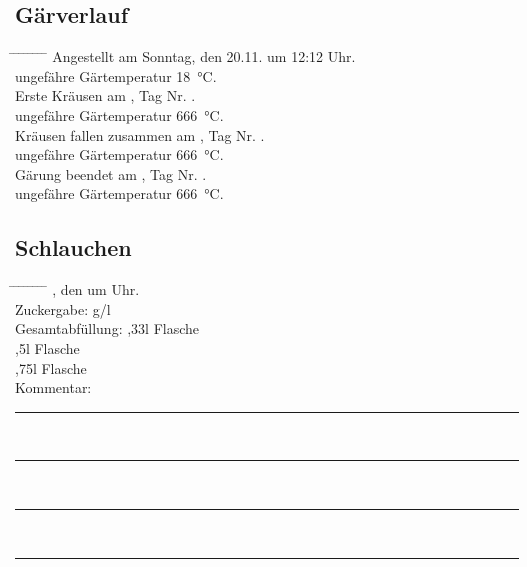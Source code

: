 \documentclass[12pt,oneside,a4paper]{scrartcl}
\begin{document}
\subsection*{Gärverlauf}
	\begin{tabbing}
		\hspace{1cm} \= \hspace{1cm} \= \hspace{1cm} \= \hspace{1cm} \= \hspace{1cm} \= \hspace{1cm} \= \hspace{1cm} \= \hspace{1cm} \= \kill
		\> Angestellt am Sonntag, den  20.11. um 12:12 Uhr.\\
		\> \> ungefähre Gärtemperatur \SI{18}{\celsius}.\\
		\> Erste Kräusen am \hspace{4cm}, Tag Nr.\hspace{2.5cm} .\\
		\> \> ungefähre Gärtemperatur \SI{666}{\celsius}.\\
		\> Kräusen fallen zusammen am \hspace{4cm}, Tag Nr. \hspace{2.5cm}.\\
		\> \> ungefähre Gärtemperatur \SI{666}{\celsius}.\\
		\> Gärung beendet am \hspace{4cm}, Tag Nr. \hspace{2.5cm}.\\
		\> \> ungefähre Gärtemperatur \SI{666}{\celsius}.
	\end{tabbing}
%
\subsection*{Schlauchen}
	\begin{tabbing}
		\hspace{1cm} \= \hspace{1cm} \= \hspace{1cm} \= \hspace{1cm} \= \hspace{1cm} \= \hspace{1cm} \= \hspace{1cm} \= \hspace{1cm} \= \kill
		\> \hspace{4cm}, den \hspace{4cm} um \hspace{2.5cm} Uhr.\\
		\> Zuckergabe: \hspace{3.2cm} g/l\\
		\> Gesamtabfüllung: \> \> \> \> ,33l Flasche\\
		\> \> \> \> \> ,5l Flasche\\
		\> \> \> \> \> ,75l Flasche\\
		\> Kommentar: \>\>\> \rule[-0.2cm]{13cm}{1pt}\\
		\> \>  \rule[-0.2cm]{15.3cm}{1pt}\\
		\> \>  \rule[-0.2cm]{15.3cm}{1pt}\\
		\> \>  \rule[-0.2cm]{15.3cm}{1pt}		
	\end{tabbing}
%
\end{document}
